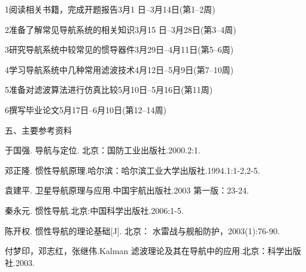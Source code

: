           {\hspace{0.5em}1\hspace{3em}阅读相关书籍，完成开题报告\hspace{4em}3月1 日--3月14日(第1--2周)}

          {\hspace{0.5em}2\hspace{3em}准备了解常见导航系统的相关知识\hspace{2em}3月15 日--3月28日(第3--4周)}

           {\hspace{0.5em}3\hspace{3em}研究导航系统中较常见的惯导器件\hspace{2em}3月29日--4月11日(第5--6周)}

           {\hspace{0.5em}4\hspace{3em}学习导航系统中几种常用滤波技术\hspace{2em}4月12日--5月9日(第7--10周)}

           {\hspace{0.5em}5\hspace{3em}准备对滤波算法进行仿真比较\hspace{4em}5月10日--5月16日(第11周)}

           {\hspace{0.5em}6\hspace{3em}撰写毕业论文\hspace{11em}5月17日--6月10日(第12--14周)}

\myhline
{\cusong\sihao 五、主要参考资料}
\begin{bibList}
\item 于国强. 导航与定位. 北京：国防工业出版社.2000.2:1.
\item 邓正隆. 惯性导航原理.哈尔滨：哈尔滨工业大学出版社.1994.1:1-2,2-5.
\item 袁建平. 卫星导航原理与应用.中国宇航出版社.2003 第一版：23-24.
\item 秦永元. 惯性导航.北京:中国科学出版社.2006:1-5.
\item 陈开权. 惯性导航的理论基础[J]. 北京： 水雷战与舰船防护，2003(1):76-90.
\item 付梦印，邓志红，张继伟.Kalman 滤波理论及其在导航中的应用.北京：科学出版社.2003.
\end{bibList}

